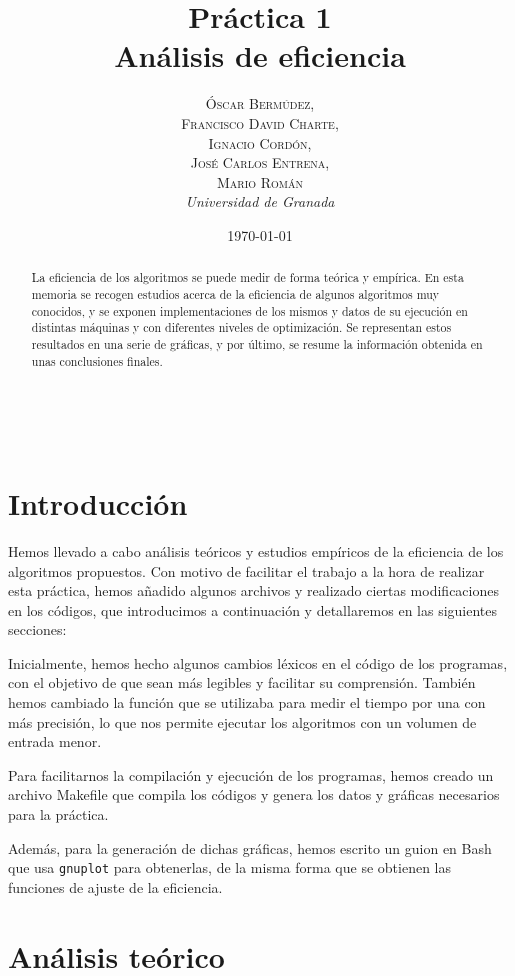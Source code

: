 \documentclass[a4paper, 11pt]{article} %
\title{\textbf{Práctica 1}\\ %
Análisis de eficiencia} %
\author{\textsc{Óscar Bermúdez,\\Francisco David Charte,\\Ignacio Cordón,\\José Carlos Entrena,\\Mario Román} %
\\{\textit{Universidad de Granada}}} %
\date{\today} %
\makeatletter
\renewcommand{\maketitle}{ %
\begin{flushright} %
{\LARGE\@title} %

\vspace{50pt} %

{\large\@author} %
\\\@date %

\vspace{40pt} %
\end{flushright}
}
\makeatother
\begin{document}
\maketitle %

\renewcommand{\abstractname}{Resumen} %
\begin{abstract}
La eficiencia de los algoritmos se puede medir de forma teórica 
y empírica. En esta memoria se recogen estudios acerca de la 
eficiencia de algunos algoritmos muy conocidos, y se exponen 
implementaciones de los mismos y datos de su ejecución en 
distintas máquinas y con diferentes niveles de optimización.
Se representan estos resultados en una serie de gráficas, y por 
último, se resume la información obtenida en unas conclusiones 
finales.
\end{abstract}
{\parskip=2pt
\tableofcontents
}
\pagebreak

\section {Introducción}
Hemos llevado a cabo análisis teóricos y estudios empíricos de la eficiencia de los algoritmos propuestos. Con motivo de facilitar el trabajo a la hora de realizar esta práctica,
hemos añadido algunos archivos y realizado ciertas modificaciones en los códigos, que
introducimos a continuación y detallaremos en las siguientes secciones: 

\medskip
Inicialmente, hemos hecho algunos cambios léxicos en el código de los programas, con el
objetivo de que sean más legibles y facilitar su comprensión. También hemos
cambiado la función que se utilizaba para medir el tiempo por una con más precisión, lo 
que nos permite ejecutar los algoritmos con un volumen de entrada menor. 

Para facilitarnos la compilación y ejecución de los programas, hemos creado un archivo 
Makefile que compila los códigos y genera los datos y gráficas necesarios para la práctica.

Además, para la generación de dichas gráficas, hemos escrito un guion en Bash que usa 
\texttt{gnuplot} para obtenerlas, de la misma forma que se obtienen las funciones de ajuste 
de la eficiencia. 

\section {Análisis teórico}
\end{document}
